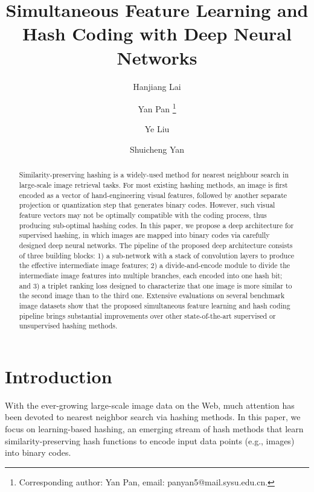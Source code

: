 \documentclass[10pt,twocolumn,letterpaper]{article}
\begin{document}
\title{Simultaneous Feature Learning and Hash Coding with Deep Neural Networks}

\author[$^{\dagger}$]{Hanjiang Lai}
\author[$^{\ddagger}$]{Yan Pan \thanks{Corresponding author: Yan Pan, email: panyan5@mail.sysu.edu.cn.}}
\author[$^\S$ ]{Ye Liu}
\author[$^{\dagger}$]{Shuicheng Yan}



\maketitle

\begin{abstract}
  Similarity-preserving hashing is a widely-used method for nearest neighbour search in large-scale image retrieval tasks. For most existing hashing methods, an image is first encoded as a vector of hand-engineering visual features, followed by another separate projection or quantization step that generates binary codes. However, such visual feature vectors may not be optimally compatible with the coding process, thus producing sub-optimal hashing codes. In this paper, we propose a deep architecture for supervised hashing, in which images are mapped into binary codes via carefully designed deep neural networks. The pipeline of the proposed deep architecture consists of three building blocks: 1) a sub-network with a stack of convolution layers to produce the effective intermediate image features; 2) a divide-and-encode module to divide the intermediate image features into multiple branches, each encoded into one hash bit; and 3) a triplet ranking loss designed to characterize that one image is more similar to the second image than to the third one. Extensive evaluations on several benchmark image datasets show that the proposed simultaneous feature learning and hash coding pipeline brings substantial improvements over other state-of-the-art supervised or unsupervised hashing methods.
\end{abstract}

\section{Introduction}
With the ever-growing large-scale image data on the Web, much
attention has been devoted to nearest neighbor search via hashing
methods. In this paper, we focus on learning-based hashing, an
emerging stream of hash methods that learn similarity-preserving
hash functions to encode input data points (e.g., images) into
binary codes.
\end{document}
